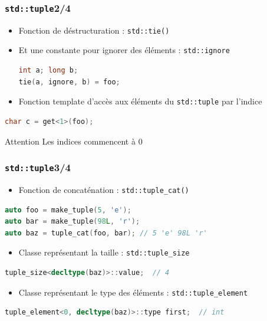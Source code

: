 \documentclass[C++.tex]{subfiles}
\begin{document}
\begin{frame}[fragile]
	\frametitle{\lstinline|std::tuple|\titlehfill{}2/4}
	\begin{itemize}
		\item Fonction de déstructuration : \lstinline|std::tie()|
		\item Et une constante pour ignorer des éléments : \lstinline|std::ignore|

		\begin{lstlisting}[language=C++]
int a; long b;
tie(a, ignore, b) = foo;\end{lstlisting}


		\item Fonction template d'accès aux éléments du \lstinline|std::tuple| par l'indice
	\end{itemize}

	\begin{lstlisting}[language=C++]
char c = get<1>(foo);\end{lstlisting}

	\begin{alertblock}{Attention}
		Les indices commencent à 0
	\end{alertblock}
\end{frame}

\begin{frame}[fragile]
	\frametitle{\lstinline|std::tuple|\titlehfill{}3/4}
	\begin{itemize}
		\item Fonction de concaténation : \lstinline|std::tuple_cat()|
	\end{itemize}

	\begin{lstlisting}[language=C++]
auto foo = make_tuple(5, 'e');
auto bar = make_tuple(98L, 'r');
auto baz = tuple_cat(foo, bar); // 5 'e' 98L 'r'\end{lstlisting}

	\begin{itemize}
		\item Classe représentant la taille : \lstinline|std::tuple_size|
	\end{itemize}

	\begin{lstlisting}[language=C++]
tuple_size<decltype(baz)>::value;  // 4\end{lstlisting}

	\begin{itemize}
		\item Classe représentant le type des éléments : \lstinline|std::tuple_element|
	\end{itemize}

	\begin{lstlisting}[language=C++]
tuple_element<0, decltype(baz)>::type first;  // int\end{lstlisting}
\end{frame}
\end{document}
